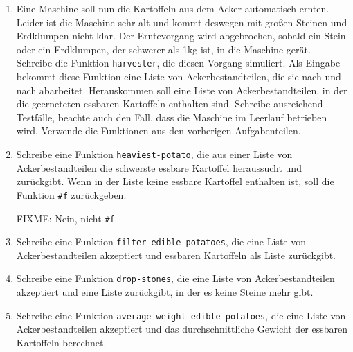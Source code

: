 \begin{aufgabe}
\begin{enumerate}
  \item Eine Maschine soll nun die Kartoffeln aus dem
    Acker automatisch ernten.  Leider ist die Maschine sehr alt und
    kommt deswegen mit großen Steinen und Erdklumpen nicht klar.  Der
    Erntevorgang wird abgebrochen, sobald ein Stein oder ein
    Erdklumpen, der schwerer als 1kg ist, in die Maschine gerät.
    Schreibe die Funktion \lstinline{harvester}, die diesen Vorgang
    simuliert. Als Eingabe bekommt diese Funktion eine Liste von
    Ackerbestandteilen, die sie nach und nach abarbeitet.
    Herauskommen soll eine Liste von Ackerbestandteilen, in der die
    geerneteten essbaren Kartoffeln enthalten sind.  Schreibe
    ausreichend Testfälle, beachte auch den Fall, dass die
    Maschine im Leerlauf betrieben wird.  Verwende die Funktionen
    aus den vorherigen Aufgabenteilen.

  \item Schreibe eine Funktion
    \lstinline{heaviest-potato}, die aus einer Liste von
    Ackerbestandteilen die schwerste essbare Kartoffel heraussucht und
    zurückgibt.  Wenn in der Liste keine essbare Kartoffel enthalten ist, soll
    die Funktion \lstinline{#f} zurückgeben.

    FIXME: Nein, nicht \lstinline{#f}
    
    \item Schreibe eine Funktion
      \lstinline{filter-edible-potatoes}, die eine Liste von
      Ackerbestandteilen akzeptiert und essbaren Kartoffeln als Liste
      zurückgibt.

    \item Schreibe eine Funktion
      \lstinline{drop-stones}, die eine Liste von Ackerbestandteilen
      akzeptiert und eine Liste zurückgibt, in der es keine Steine mehr
      gibt.

    \item Schreibe eine Funktion
      \lstinline{average-weight-edible-potatoes}, die eine Liste von
      Ackerbestandteilen akzeptiert und das durchschnittliche Gewicht
      der essbaren Kartoffeln berechnet.

  \end{enumerate}
  
\end{aufgabe}

